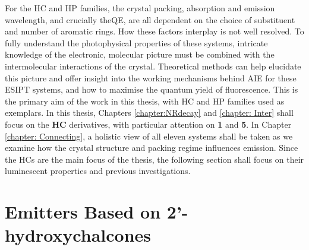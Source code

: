 For the \ac{HC} and \ac{HP} families, the crystal packing, absorption and emission wavelength, and crucially the\ac{QE}, are all dependent on the choice of substituent and number of aromatic rings. How these factors interplay is not well resolved. To fully understand the photophysical properties of these systems, intricate knowledge of the electronic, molecular picture must be combined with the intermolecular interactions of the crystal. Theoretical methods can help elucidate this picture and offer insight into the working mechanisms behind \ac{AIE} for these \ac{ESIPT} systems, and how to maximise the quantum yield of fluorescence. This is the primary aim of the work in this thesis, with \ac{HC} and \ac{HP} families used as exemplars. In this thesis, Chapters \ref{chapter:NRdecay} and \ref{chapter: Inter} shall focus on the \textbf{HC} derivatives, with particular attention on \textbf{1} and \textbf{5}. In Chapter \ref{chapter: Connecting}, a holistic view of all eleven systems shall be taken as we examine how the crystal structure and packing regime influences emission. Since the \acp{HC} are the main focus of the thesis, the following section shall focus on their luminescent properties and previous investigations.  
\section{Emitters Based on 2'-hydroxychalcones}\label{section: lom HC}

